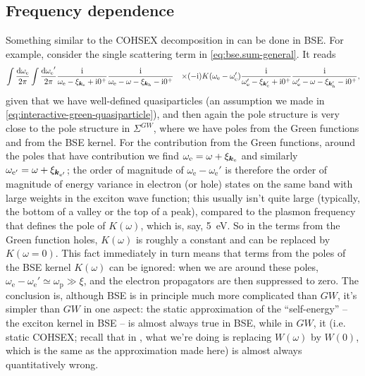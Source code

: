 \documentclass[hyperref, a4paper, 12pt]{report}
\newcommand*{\ii}{\mathrm{i}}
\def\\{}%
\begin{document}
\subsection{Frequency dependence}

Something similar to the COHSEX decomposition in 
can be done in BSE. 
For example, consider the single scattering term in \eqref{eq:bse.sum-general}.
It reads
\begin{equation}
    \begin{aligned}
        \int \frac{\dd{\omega_\text{e}}}{2\pi} \int \frac{\dd{\omega_\text{e}}'}{2\pi} 
        &\frac{\ii}{\omega_{\text{e}} - \xi_{\vb*{k}_{\text{e}}} + \ii 0^+}
        \frac{\ii}{\omega_{\text{e}} - \omega - \xi_{\vb*{k}_{\text{h}}} - \ii 0^+} \\
        &\times (-\ii ) K(\omega_{\text{e}} - \omega_{\text{e}}') 
        \frac{\ii}{\omega_{\text{e}}' - \xi_{\vb*{k}_{\text{e}}'} + \ii 0^+}
        \frac{\ii}{\omega_{\text{e}}' - \omega - \xi_{\vb*{k}_{\text{h}}'} - \ii 0^+},
    \end{aligned}
\end{equation}
given that we have well-defined quasiparticles
(an assumption we made in \eqref{eq:interactive-green-quasiparticle}), 
and then again the pole structure is very close to the pole structure in $\Sigma^{GW}$,
where we have poles from the Green functions and from the BSE kernel.
For the contribution from the Green functions,
around the poles that have contribution we find 
$\omega_{\text{e}} = \omega + \xi_{\vb*{k}_{\text{e}}}$ 
and similarly $\omega_{\text{e}'} = \omega + \xi_{\vb*{k}_{\text{e}'}}$;
the order of magnitude of $\omega_{\text{e}} - \omega_{\text{e}}'$
is therefore the order of magnitude of energy variance in 
electron (or hole) states on the same band with large weights in the exciton wave function;
this usually isn't quite large (typically, the bottom of a valley or the top of a peak),
compared to the plasmon frequency that defines the pole of $K(\omega)$, 
which is, say, \SI{5}{eV}.
So in the terms from the Green function holes, 
$K(\omega)$ is roughly a constant and can be replaced by $K(\omega = 0)$.
This fact immediately in turn means that
terms from the poles of the BSE kernel $K(\omega)$ can be ignored:
when we are around these poles, 
$\omega_{\text{e}} - \omega_{\text{e}}' \simeq \omega_{\text{p}} \gg \xi$,
and the electron propagators are then suppressed to zero.
The conclusion is, although BSE is in principle much more complicated than $GW$,
it's simpler than $GW$ in one aspect:
the static approximation of the ``self-energy'' -- the exciton kernel in BSE -- 
is almost always true in BSE, 
while in $GW$, it (i.e. static COHSEX; recall that in , what we're doing is replacing $W(\omega)$ by $W(0)$, which is the same as the approximation made here) is almost always quantitatively wrong.
\end{document}
